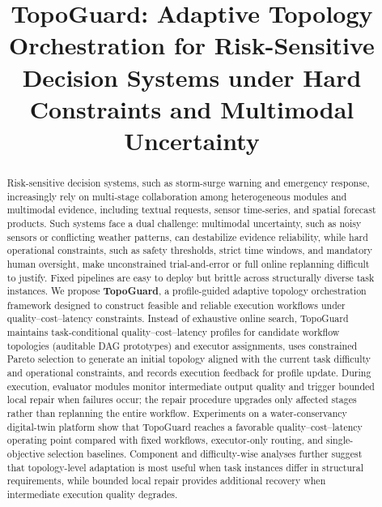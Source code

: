 \documentclass[manuscript,review,anonymous]{acmart}
\begin{document}
\title{TopoGuard: Adaptive Topology Orchestration for Risk-Sensitive Decision Systems under Hard Constraints and Multimodal Uncertainty}



\begin{abstract}
Risk-sensitive decision systems, such as storm-surge warning and emergency response, increasingly rely on multi-stage collaboration among heterogeneous modules and multimodal evidence, including textual requests, sensor time-series, and spatial forecast products. Such systems face a dual challenge: multimodal uncertainty, such as noisy sensors or conflicting weather patterns, can destabilize evidence reliability, while hard operational constraints, such as safety thresholds, strict time windows, and mandatory human oversight, make unconstrained trial-and-error or full online replanning difficult to justify. Fixed pipelines are easy to deploy but brittle across structurally diverse task instances. We propose \textbf{TopoGuard}, a profile-guided adaptive topology orchestration framework designed to construct feasible and reliable execution workflows under quality--cost--latency constraints. Instead of exhaustive online search, TopoGuard maintains task-conditional quality--cost--latency profiles for candidate workflow topologies (auditable DAG prototypes) and executor assignments, uses constrained Pareto selection to generate an initial topology aligned with the current task difficulty and operational constraints, and records execution feedback for profile update. During execution, evaluator modules monitor intermediate output quality and trigger bounded local repair when failures occur; the repair procedure upgrades only affected stages rather than replanning the entire workflow. Experiments on a water-conservancy digital-twin platform show that TopoGuard reaches a favorable quality--cost--latency operating point compared with fixed workflows, executor-only routing, and single-objective selection baselines. Component and difficulty-wise analyses further suggest that topology-level adaptation is most useful when task instances differ in structural requirements, while bounded local repair provides additional recovery when intermediate execution quality degrades.
\end{abstract}
\end{document}
